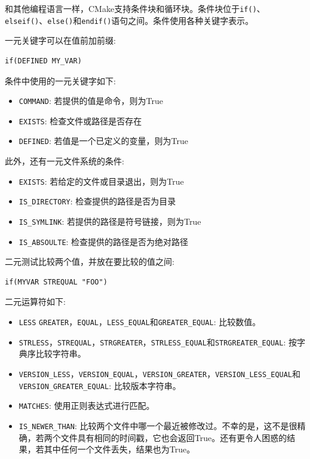 和其他编程语言一样，CMake支持条件块和循环块。条件块位于\texttt{if()}、\texttt{elseif()}、\texttt{else()}和\texttt{endif()}语句之间。条件使用各种关键字表示。

一元关键字可以在值前加前缀:

\begin{lstlisting}[style=styleCMake]
if(DEFINED MY_VAR)
\end{lstlisting}

条件中使用的一元关键字如下:

\begin{itemize}
\item 
\texttt{COMMAND}: 若提供的值是命令，则为True

\item 
\texttt{EXISTS}: 检查文件或路径是否存在

\item 
\texttt{DEFINED}: 若值是一个已定义的变量，则为True
\end{itemize}

此外，还有一元文件系统的条件:

\begin{itemize}
\item 
\texttt{EXISTS}: 若给定的文件或目录退出，则为True

\item 
\texttt{IS\_DIRECTORY}: 检查提供的路径是否为目录

\item 
\texttt{IS\_SYMLINK}: 若提供的路径是符号链接，则为True

\item 
\texttt{IS\_ABSOULTE}: 检查提供的路径是否为绝对路径
\end{itemize}

二元测试比较两个值，并放在要比较的值之间:

\begin{lstlisting}[style=styleCMake]
if(MYVAR STREQUAL "FOO")
\end{lstlisting}

二元运算符如下:

\begin{itemize}
\item 
\texttt{LESS} \texttt{GREATER}，\texttt{EQUAL}，\texttt{LESS\_EQUAL}和\texttt{GREATER\_EQUAL}: 比较数值。

\item 
\texttt{STRLESS}，\texttt{STREQUAL}，\texttt{STRGREATER}，\texttt{STRLESS\_EQUAL}和\texttt{STRGREATER\_EQUAL}: 按字典序比较字符串。

\item 
\texttt{VERSION\_LESS}，\texttt{VERSION\_EQUAL}，\texttt{VERSION\_GREATER}，\texttt{VERSION\_LESS\_EQUAL}和\texttt{VERSION\_GREATER\_EQUAL}: 比较版本字符串。

\item 
\texttt{MATCHES}: 使用正则表达式进行匹配。

\item 
\texttt{IS\_NEWER\_THAN}: 比较两个文件中哪一个最近被修改过。不幸的是，这不是很精确，若两个文件具有相同的时间戳，它也会返回True。还有更令人困惑的结果，若其中任何一个文件丢失，结果也为True。
\end{itemize}

